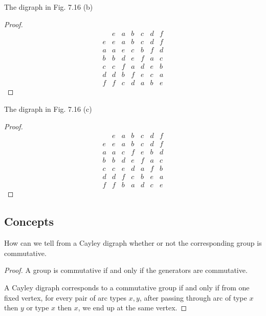 \begin{exercise}
    The digraph in Fig. 7.16 (b)
\end{exercise}

\begin{proof}
    \[
        \begin{array}{c|cccccc}
              & e & a & b & c & d & f \\
            \hline
            e & e & a & b & c & d & f \\
            a & a & e & c & b & f & d \\
            b & b & d & e & f & a & c \\
            c & c & f & a & d & e & b \\
            d & d & b & f & e & c & a \\
            f & f & c & d & a & b & e
        \end{array}
    \]
\end{proof}

\begin{exercise}
    The digraph in Fig. 7.16 (c)
\end{exercise}

\begin{proof}
    \[
        \begin{array}{c|cccccc}
              & e & a & b & c & d & f \\
            \hline
            e & e & a & b & c & d & f \\
            a & a & c & f & e & b & d \\
            b & b & d & e & f & a & c \\
            c & c & e & d & a & f & b \\
            d & d & f & c & b & e & a \\
            f & f & b & a & d & c & e
        \end{array}
    \]
\end{proof}

\subsection*{Concepts}

\begin{exercise}
    How can we tell from a Cayley digraph whether or not the corresponding group is commutative.
\end{exercise}

\begin{proof}
    A group is commutative if and only if the generators are commutative.

    A Cayley digraph corresponds to a commutative group if and only if from one fixed vertex, for every pair of arc types $x, y$, after passing through arc of type $x$ then $y$ or type $x$ then $x$, we end up at the same vertex.
\end{proof}

